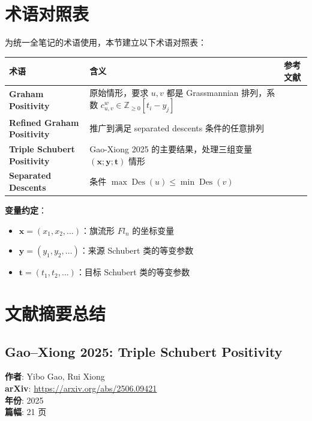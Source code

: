 \section{术语对照表}
\label{sec:TerminologyTable}

为统一全笔记的术语使用，本节建立以下术语对照表：

\begin{center}
\begin{tabular}{p{4cm} p{6cm} p{4cm}}
\toprule
术语 & 含义 & 参考文献 \\ \midrule
\textbf{Graham Positivity} & 原始情形，要求 $u, v$ 都是 Grassmannian 排列，系数 $c^w_{u,v} \in \mathbb{Z}_{\geq 0}[t_i-y_j]$ & \cite{Gr} \\
\textbf{Refined Graham Positivity} & 推广到满足 separated descents 条件的任意排列 & \cite{GX2025} \\
\textbf{Triple Schubert Positivity} & Gao-Xiong 2025 的主要结果，处理三组变量 $(\mathbf{x}; \mathbf{y}; \mathbf{t})$ 情形 & \cite{GX2025} \\
\textbf{Separated Descents} & 条件 $\max\operatorname{Des}(u) \leq \min\operatorname{Des}(v)$ & \cite{Sa} \\
\bottomrule
\end{tabular}
\end{center}

\textbf{变量约定}：
\begin{itemize}
\item $\mathbf{x} = (x_1, x_2, \ldots)$：旗流形 $Fl_n$ 的坐标变量
\item $\mathbf{y} = (y_1, y_2, \ldots)$：来源 Schubert 类的等变参数
\item $\mathbf{t} = (t_1, t_2, \ldots)$：目标 Schubert 类的等变参数
\end{itemize}

\section{文献摘要总结}
\label{sec:LiteratureSummary}

\subsection{Gao--Xiong \cite{GX2025} 2025: Triple Schubert Positivity}
\textbf{作者}: Yibo Gao, Rui Xiong \\
\textbf{arXiv}: \url{https://arxiv.org/abs/2506.09421} \\
\textbf{年份}: 2025 \\
\textbf{篇幅}: 21 页

